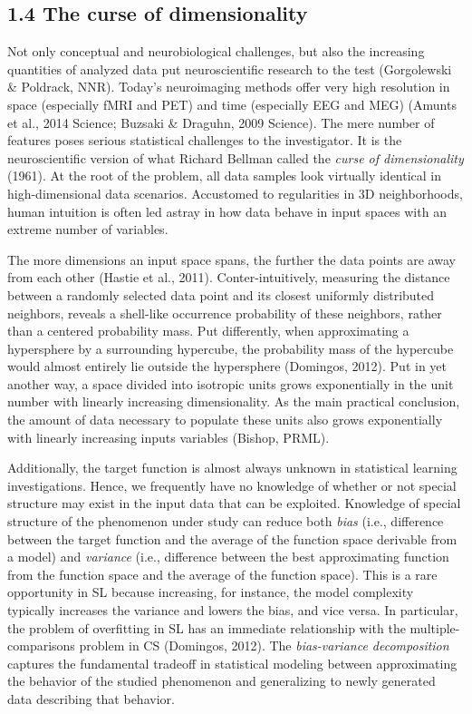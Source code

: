 \documentclass[authoryear,review,3p]{elsarticle}
\begin{document}
\subsection*{1.4 The curse of dimensionality}

Not only conceptual and neurobiological challenges,
but also the increasing quantities of analyzed data
put neuroscientific research to the test
(Gorgolewski \& Poldrack, NNR).
%
Today's neuroimaging methods offer very high resolution in
space (especially fMRI and PET)
and
time (especially EEG and MEG)
(Amunts et al., 2014 Science; Buzsaki \& Draguhn, 2009 Science).
%
The mere number of features poses serious
statistical challenges to the investigator.
It is the neuroscientific version of what Richard Bellman
called the \textit{curse of dimensionality} (1961).
%
At the root of the problem,
all data samples look virtually identical
in high-dimensional data scenarios.
%
Accustomed to regularities in 3D neighborhoods,
human intuition is often led astray in
how data behave in
input spaces with an extreme number of variables.



The more dimensions an input space spans,
the further the data points are away from each other
(Hastie et al., 2011).
Conter-intuitively,
measuring the distance between a randomly selected data point
and its closest uniformly distributed neighbors,
reveals a shell-like occurrence probability of
these neighbors, rather than a centered probability mass.
%
Put differently,
when approximating a hypersphere by a surrounding hypercube,
the probability mass of the hypercube
would almost entirely lie outside the hypersphere
(Domingos, 2012).
%
Put in yet another way,
a space divided into isotropic units grows exponentially in the
unit number with linearly increasing dimensionality.
As the main practical conclusion,
the amount of data necessary to populate these units
also grows exponentially
with linearly increasing inputs variables
(Bishop, PRML).



Additionally,
the target function is almost always unknown
in statistical learning investigations.
Hence, we frequently have no knowledge of whether or not
special structure may exist in the input data that can be exploited.
%
Knowledge of special structure of the phenomenon under study
can reduce both \textit{bias}
(i.e., difference between the target function and
the average of the function space derivable from a model)
and
\textit{variance}
(i.e., difference between the best approximating function 
from the function space and
the average of the function space).
This is a rare opportunity in SL because increasing,
for instance, the model complexity
typically increases the variance and lowers the bias, and vice versa.
%
In particular,
the problem of overfitting in SL has an immediate relationship
with the multiple-comparisons problem in CS
(Domingos, 2012).
%
The \textit{bias-variance decomposition} captures the fundamental
tradeoff in statistical modeling between
approximating the behavior of
the studied phenomenon and
generalizing to newly generated data describing that behavior. 
\end{document}
